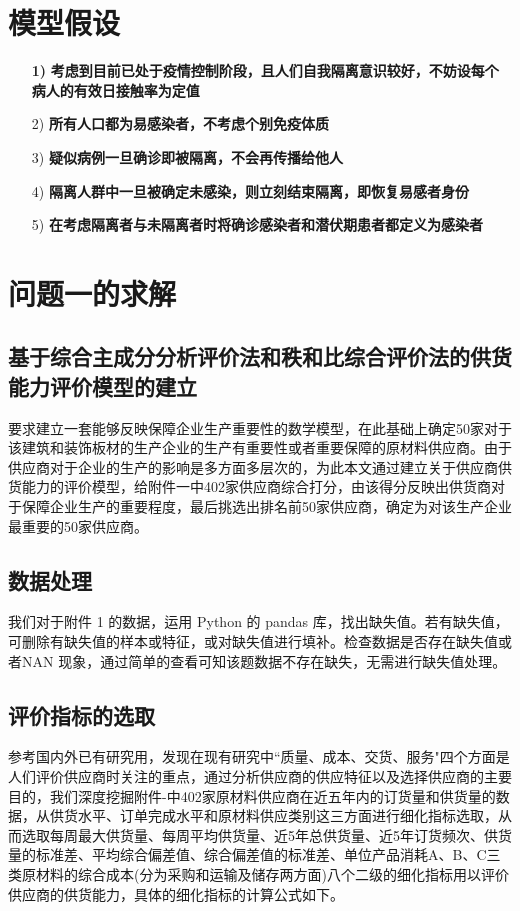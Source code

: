 \documentclass[UTF8]{ctexart}
\begin{document}
\section{模型假设}

\begin{itemize}
	\item [\bf{1)}]\bf{考虑到目前已处于疫情控制阶段，且人们自我隔离意识较好，不妨设每个病人的有效日接触率为定值}
	\item [2)]\bf{所有人口都为易感染者，不考虑个别免疫体质}
	\item [3)]\bf{疑似病例一旦确诊即被隔离，不会再传播给他人}
	\item [4)]\bf{隔离人群中一旦被确定未感染，则立刻结束隔离，即恢复易感者身份}
	\item [5)]\bf{在考虑隔离者与未隔离者时将确诊感染者和潜伏期患者都定义为感染者}

\end{itemize}


\section{问题一的求解}
\subsection{基于综合主成分分析评价法和秩和比综合评价法的供货能力评价模型的建立}

要求建立一套能够反映保障企业生产重要性的数学模型，在此基础上确定50家对于该建筑和装饰板材的生产企业的生产有重要性或者重要保障的原材料供应商。由于供应商对于企业的生产的影响是多方面多层次的，为此本文通过建立关于供应商供货能力的评价模型，给附件一中402家供应商综合打分，由该得分反映出供货商对于保障企业生产的重要程度，最后挑选出排名前50家供应商，确定为对该生产企业最重要的50家供应商。

\subsection{数据处理}
我们对于附件 1 的数据，运用 Python 的 pandas 库，找出缺失值。若有缺失值，可删除有缺失值的样本或特征，或对缺失值进行填补。检查数据是否存在缺失值或者NAN 现象，通过简单的查看可知该题数据不存在缺失，无需进行缺失值处理。

\subsection{评价指标的选取}
参考国内外已有研究用，发现在现有研究中“质量、成本、交货、服务"四个方面是人们评价供应商时关注的重点，通过分析供应商的供应特征以及选择供应商的主要目的，我们深度挖掘附件-中402家原材料供应商在近五年内的订货量和供货量的数据，从供货水平、订单完成水平和原材料供应类别这三方面进行细化指标选取，从而选取每周最大供货量、每周平均供货量、近5年总供货量、近5年订货频次、供货量的标准差、平均综合偏差值、综合偏差值的标准差、单位产品消耗A、B、C三类原材料的综合成本(分为采购和运输及储存两方面)八个二级的细化指标用以评价供应商的供货能力，具体的细化指标的计算公式如下。
\end{document}
